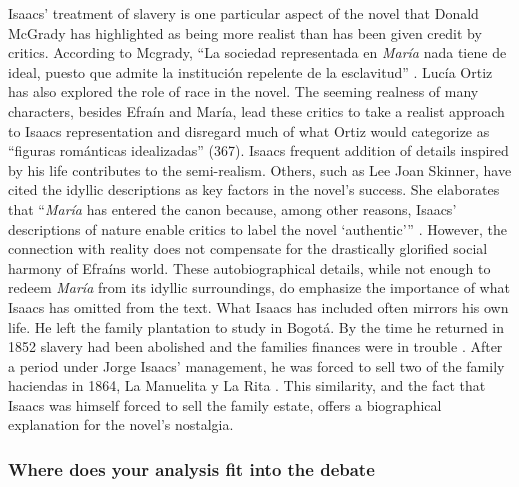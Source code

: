 \documentclass[12pt]{report}
\begin{document}
Isaacs' treatment of slavery is one particular aspect of the novel that Donald McGrady has highlighted as being more realist than has been given credit by critics. 
According to Mcgrady, \enquote{La sociedad representada en \textit{María} nada tiene de ideal, puesto que admite la institución repelente de la esclavitud} \autocite[24]{McGrady2012}.
Lucía Ortiz has also explored the role of race in the novel. 
The seeming realness of many characters, besides Efraín and María, lead these critics to take a realist approach to Isaacs representation and disregard much of what Ortiz would categorize as \enquote{figuras románticas idealizadas} (367)\nocite{Ortiz2007}. 
Isaacs frequent addition of details inspired by his life contributes to the semi-realism. 
Others, such as Lee Joan Skinner, have cited the idyllic descriptions as key factors in the novel's success.
She elaborates that \enquote{\textit{María} has entered the canon because, among other reasons, Isaacs' descriptions of nature enable critics to label the novel \enquote{authentic}} \autocite[13]{Skinner2014}.
However, the connection with reality does not compensate for the drastically glorified social harmony of Efraíns world. 
These autobiographical details, while not enough to redeem \textit{María} from its idyllic surroundings, do emphasize the importance of what Isaacs has omitted from the text.
What Isaacs has included often mirrors his own life. He left the family plantation to study in Bogotá. By the time he returned in 1852 slavery had been abolished and the families finances were in trouble \autocite[145]{Jagoe2003}. 
After a period under Jorge Isaacs' management, he was forced to sell two of the family haciendas in 1864, La Manuelita y La Rita \autocite[261]{Mejia1976}.
This similarity, and the fact that Isaacs was himself forced to sell the family estate, offers a biographical explanation for the novel's nostalgia. 


\subsubsection{Where does your analysis fit into the debate}
\end{document}
